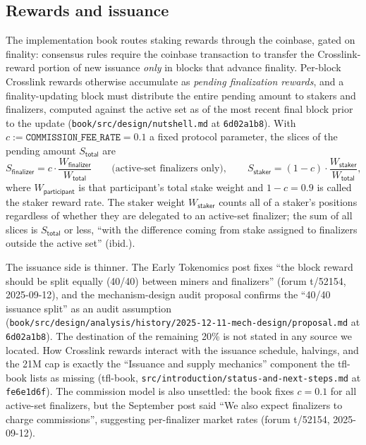 \documentclass[11pt,a4paper]{article}
\theoremstyle{definition}
\begin{document}
\subsection{Rewards and issuance}\label{sec:xl-stake-rewards}

The implementation book routes staking rewards through the coinbase, gated
on finality: consensus rules require the coinbase transaction to transfer
the Crosslink-reward portion of new issuance \emph{only} in blocks that
advance finality. Per-block Crosslink rewards otherwise accumulate as
\emph{pending finalization rewards}, and a finality-updating block must
distribute the entire pending amount to stakers and finalizers, computed
against the active set as of the most recent final block prior to the
update (\texttt{book/src/design/nutshell.md} at \texttt{6d02a1b8}). With
$c := \texttt{COMMISSION\_FEE\_RATE} = 0.1$ a fixed protocol parameter,
the slices of the pending amount $S_{\mathsf{total}}$ are
%
\begin{equation}\label{eq:xl-reward-slices}
S_{\mathsf{finalizer}}
  = c \cdot \frac{W_{\mathsf{finalizer}}}{W_{\mathsf{total}}}
\qquad\text{(active-set finalizers only)},
\qquad
S_{\mathsf{staker}}
  = (1 - c) \cdot \frac{W_{\mathsf{staker}}}{W_{\mathsf{total}}},
\end{equation}
%
where $W_{\mathsf{participant}}$ is that participant's total stake weight
and $1 - c = 0.9$ is called the staker reward rate. The staker weight
$W_{\mathsf{staker}}$ counts all of a staker's positions regardless of
whether they are delegated to an active-set finalizer; the sum of all
slices is $S_{\mathsf{total}}$ or less, ``with the difference coming from
stake assigned to finalizers outside the active set'' (ibid.).

The issuance side is thinner. The Early Tokenomics post fixes ``the block
reward should be split equally (40/40) between miners and finalizers''
(forum t/52154, 2025-09-12), and the mechanism-design audit proposal
confirms the ``40/40 issuance split'' as an audit assumption
(\texttt{book/src/design/analysis/history/2025-12-11-mech-design/proposal.md}
at \texttt{6d02a1b8}). The destination of the remaining 20\% is not stated
in any source we located.
How Crosslink rewards interact with the issuance schedule, halvings, and
the 21M cap is exactly the ``Issuance and supply mechanics'' component the
tfl-book lists as missing (tfl-book,
\texttt{src/introduction/status-and-next-steps.md} at \texttt{fe6e1d6f}).
The commission model is also unsettled: the book fixes $c = 0.1$ for all
active-set finalizers, but the September post said ``We also expect
finalizers to charge commissions'', suggesting per-finalizer market rates
(forum t/52154, 2025-09-12).
\end{document}
